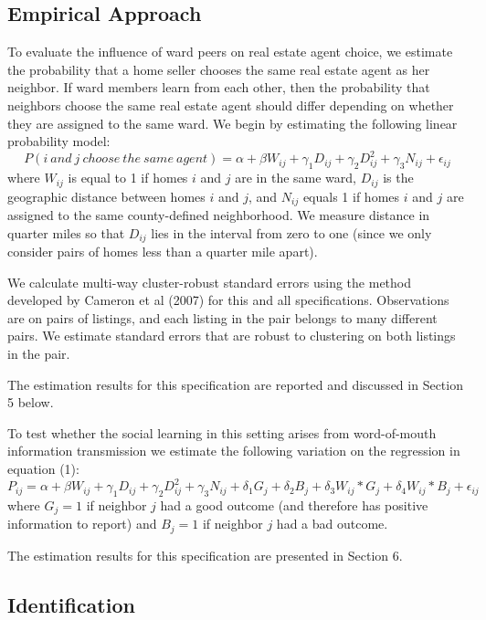 \documentclass[12pt]{article}
\begin{document}
\subsection*{Empirical Approach}

    To evaluate the influence of ward peers on real estate agent choice, we estimate the probability that a home seller chooses the same real estate agent as her neighbor. If ward members
    learn from each other, then the probability that neighbors choose the same real estate agent should differ depending on whether they are assigned to the same
    ward. We begin by estimating the following linear probability model:
    \begin{equation}
        P(i\ and\ j\ choose\ the\ same\ agent) = \alpha + \beta W_{ij} + \gamma_1 D_{ij} + \gamma_2 D^2_{ij}  + \gamma_3 N_{ij} + \epsilon_{ij}
    \end{equation}
    \noindent where $W_{ij}$ is equal to 1 if homes $i$ and $j$ are in the same ward, $D_{ij}$ is the geographic distance between homes $i$ and $j$,
    and $N_{ij}$ equals 1 if homes $i$ and $j$ are assigned to the same county-defined neighborhood.  We measure distance in quarter miles so that
    $D_{ij}$ lies in the interval from zero to one (since we only consider pairs of homes less than a quarter mile apart).

    We calculate multi-way cluster-robust standard errors using the method developed by Cameron et al (2007) for this and all specifications.  Observations are
    on pairs of listings, and each listing in the pair belongs to many different pairs.  We estimate standard errors that are robust to clustering
    on both listings in the pair.

    The estimation results for this specification are reported and discussed in Section 5 below.

    To test whether the social learning in this setting arises from word-of-mouth information transmission we estimate the following variation on the
    regression in equation (1):
    \[ P_{ij} = \alpha + \beta W_{ij} + \gamma_1 D_{ij} + \gamma_2 D^2_{ij} + \gamma_3 N_{ij} + \delta_1 G_j +
    \delta_2 B_j + \delta_3 W_{ij} * G_j + \delta_4 W_{ij} * B_j + \epsilon_{ij} \]
    where $G_j = 1$ if neighbor $j$ had a good outcome (and therefore has positive information to report) and $B_j = 1$ if neighbor $j$ had a bad
    outcome.

    The estimation results for this specification are presented in Section 6.

\subsection*{Identification}
\end{document}
